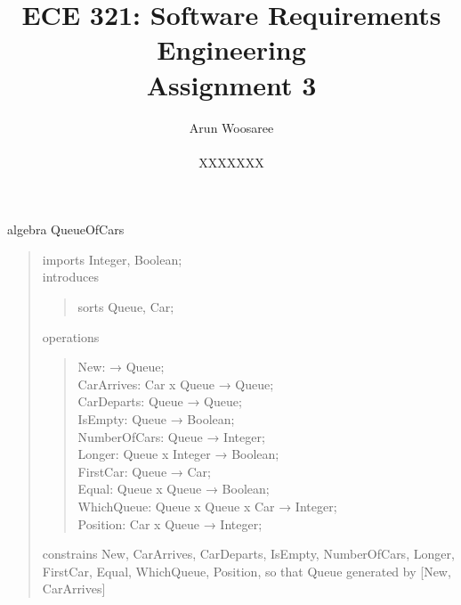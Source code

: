 \documentclass[letterpaper,12pt]{article}
\title{ECE 321: Software Requirements Engineering \\ Assignment 3}
\author{Arun Woosaree \\ \\ XXXXXXX}
\begin{document}
\maketitle

algebra QueueOfCars
\begin{quote}
 imports Integer, Boolean;\\
 introduces
 \begin{quote}
  sorts Queue, Car;
 \end{quote}
 operations
 \begin{quote}
  New: → Queue;\\
  CarArrives: Car x Queue → Queue;\\
  CarDeparts: Queue → Queue;\\
  IsEmpty: Queue → Boolean;\\
  NumberOfCars: Queue → Integer;\\
  Longer: Queue x Integer → Boolean;\\
  FirstCar: Queue → Car;\\
  Equal: Queue x Queue → Boolean;\\
  WhichQueue: Queue x Queue x Car → Integer;\\
  Position: Car x Queue → Integer;
 \end{quote}
 constrains New, CarArrives, CarDeparts, IsEmpty, NumberOfCars, Longer, FirstCar, Equal, WhichQueue, Position, so that Queue generated by [New, CarArrives]\\
 

\end{quote}
\end{document}
